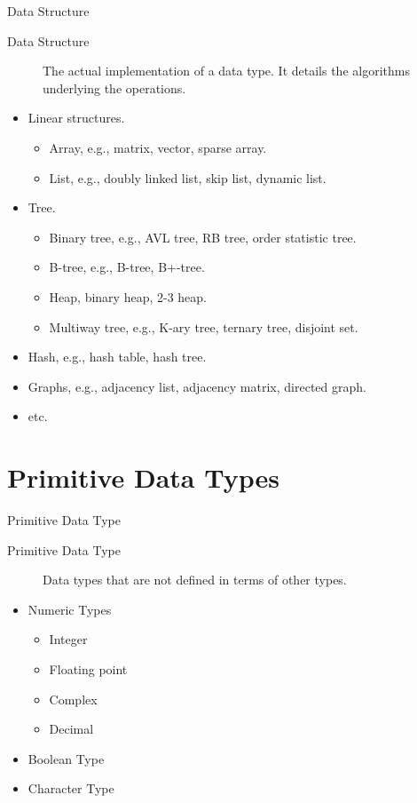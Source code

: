 \documentclass[presentation]{beamer}
\begin{document}
\begin{frame}[label={sec:orgheadline3}]{Data Structure}
\begin{description}
\item[{Data Structure}] The actual implementation of a data type.  It
details the algorithms underlying the operations.
\end{description}


\begin{itemize}
\item Linear structures.
\begin{itemize}
\item Array, e.g., matrix, vector, sparse array.
\item List, e.g., doubly linked list, skip list, dynamic list.
\end{itemize}
\item Tree.
\begin{itemize}
\item Binary tree, e.g., AVL tree, RB tree, order statistic tree.
\item B-tree, e.g., B-tree, B+-tree.
\item Heap, binary heap, 2-3 heap.
\item Multiway tree, e.g., K-ary tree, ternary tree, disjoint set.
\end{itemize}
\item Hash, e.g., hash table, hash tree.
\item Graphs, e.g., adjacency list, adjacency matrix, directed graph.
\item etc.
\end{itemize}
\end{frame}

\section{Primitive Data Types}
\label{sec:orgheadline16}

\begin{frame}[label={sec:orgheadline5}]{Primitive Data Type}
\begin{description}
\item[{Primitive Data Type}] Data types that are not defined in terms
of other types.
\end{description}


\begin{itemize}
\item Numeric Types
\begin{itemize}
\item Integer
\item Floating point
\item Complex
\item Decimal
\end{itemize}
\item Boolean Type
\item Character Type
\end{itemize}
\end{frame}
\end{document}
